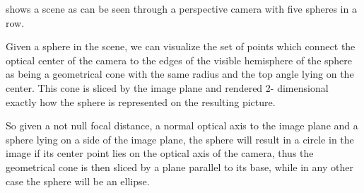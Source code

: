 \documentclass[a4paper,twocolumn]{article}
\begin{document}
	
	
	 shows a scene as can be seen through a perspective camera with five spheres in a row. 
	
	Given a sphere in the scene, we can visualize the set of points which connect the optical center of the camera to the edges of the visible hemisphere of the sphere as being a geometrical cone with the same radius and the top angle lying on the center. This cone is sliced by the image plane and rendered 2- dimensional exactly how the sphere is represented on the resulting picture.
	
	So given a not null focal distance, a normal optical axis to the image plane and a sphere lying on a side of the image plane, the sphere will result in a circle in the image if its center point lies on the optical axis of the camera, thus the geometrical cone is then sliced by a plane parallel to its base, while in any other case the sphere will be an ellipse.
	
	
\end{document}
